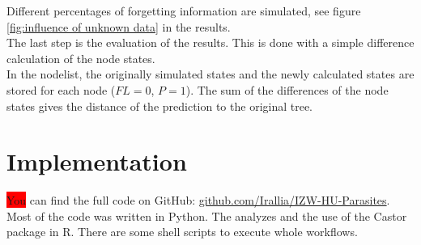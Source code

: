     Different percentages of forgetting information are simulated, see figure 
      \ref{fig:influence of unknown data} in the results. \\
  
    The last step is the evaluation of the results. This is done with a simple difference calculation 
      of the node states. \\
    In the nodelist, the originally simulated states and the newly calculated states are stored for 
      each node ($FL = 0$, $P = 1$). The sum of the differences of the node states gives the distance 
      of the prediction to the original tree.


  \section{Implementation}
    \colorbox{red}{You} can find the full code on GitHub: 
      \hyperlink{github.com/Irallia/IZW-HU-Parasites}{github.com/Irallia/IZW-HU-Parasites}. \\
    Most of the code was written in Python. The analyzes and the use of the Castor package in R. There 
      are some shell scripts to execute whole workflows.

